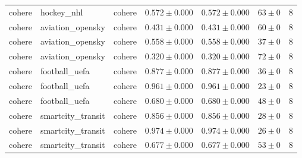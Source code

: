 \begin{table}[htbp]
\begin{tabular}{l l l r r r r}
cohere & hockey\_nhl & cohere & $0.572\pm0.000$ & $0.572\pm0.000$ & $63\pm0$ & 8 \\
cohere & aviation\_opensky & cohere & $0.431\pm0.000$ & $0.431\pm0.000$ & $60\pm0$ & 8 \\
cohere & aviation\_opensky & cohere & $0.558\pm0.000$ & $0.558\pm0.000$ & $37\pm0$ & 8 \\
cohere & aviation\_opensky & cohere & $0.320\pm0.000$ & $0.320\pm0.000$ & $72\pm0$ & 8 \\
cohere & football\_uefa & cohere & $0.877\pm0.000$ & $0.877\pm0.000$ & $36\pm0$ & 8 \\
cohere & football\_uefa & cohere & $0.961\pm0.000$ & $0.961\pm0.000$ & $23\pm0$ & 8 \\
cohere & football\_uefa & cohere & $0.680\pm0.000$ & $0.680\pm0.000$ & $48\pm0$ & 8 \\
cohere & smartcity\_transit & cohere & $0.856\pm0.000$ & $0.856\pm0.000$ & $28\pm0$ & 8 \\
cohere & smartcity\_transit & cohere & $0.974\pm0.000$ & $0.974\pm0.000$ & $26\pm0$ & 8 \\
cohere & smartcity\_transit & cohere & $0.677\pm0.000$ & $0.677\pm0.000$ & $53\pm0$ & 8 \\
\hline
\end{tabular}
\end{table}
